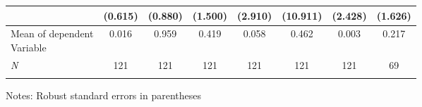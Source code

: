 \begin{table}[H]
{\begin{threeparttable}
\begin{tabular}{lccccccc}
                    &     (0.615)         &     (0.880)         &     (1.500)         &     (2.910)         &    (10.911)         &     (2.428)         &     (1.626)         \\
\midrule
\makecell{Mean of dependent \\ Variable}&       0.016         &       0.959         &       0.419         &       0.058         &       0.462         &       0.003         &       0.217         \\
\textit{N}          &         121         &         121         &         121         &         121         &         121         &         121         &          69         \\
\bottomrule[0.5pt]                                                                               \label{tab:table2}                                                                       \end{tabular}                                                                                                    \vspace{-13pt}                                                                                           \begin{tablenotes}[flushleft]{\setlength{\itemindent}{-3pt}}          \small                                                                                                           \item Notes: Robust standard errors in parentheses           \end{tablenotes}                                                                                         \end{threeparttable}                                                                             }                                                                                                                        \end{table}
